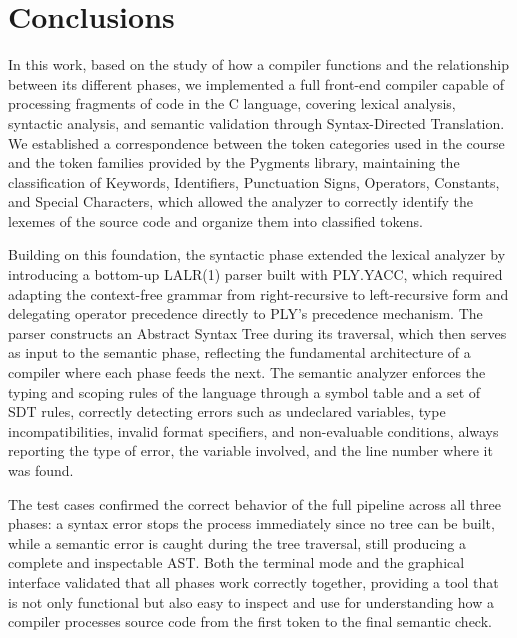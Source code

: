 \documentclass[letterpaper,12pt,oneside]{article}
\begin{document}
\section{Conclusions}

In this work, based on the study of how a compiler functions and the relationship 
between its different phases, we implemented a full front-end compiler capable of 
processing fragments of code in the C language, covering lexical analysis, syntactic 
analysis, and semantic validation through Syntax-Directed Translation. We established 
a correspondence between the token categories used in the course and the token families 
provided by the Pygments library, maintaining the classification of Keywords, 
Identifiers, Punctuation Signs, Operators, Constants, and Special Characters, which 
allowed the analyzer to correctly identify the lexemes of the source code and organize 
them into classified tokens.

Building on this foundation, the syntactic phase extended the lexical analyzer by 
introducing a bottom-up LALR(1) parser built with PLY.YACC, which required adapting 
the context-free grammar from right-recursive to left-recursive form and delegating 
operator precedence directly to PLY's precedence mechanism. The parser constructs an 
Abstract Syntax Tree during its traversal, which then serves as input to the semantic 
phase, reflecting the fundamental architecture of a compiler where each phase feeds 
the next. The semantic analyzer enforces the typing and scoping rules of the language 
through a symbol table and a set of SDT rules, correctly detecting errors such as 
undeclared variables, type incompatibilities, invalid format specifiers, and 
non-evaluable conditions, always reporting the type of error, the variable involved, 
and the line number where it was found.

The test cases confirmed the correct behavior of the full pipeline across all three 
phases: a syntax error stops the process immediately since no tree can be built, while 
a semantic error is caught during the tree traversal, still producing a complete and 
inspectable AST. Both the terminal mode and the graphical interface validated that all 
phases work correctly together, providing a tool that is not only functional but also 
easy to inspect and use for understanding how a compiler processes source code from 
the first token to the final semantic check.


\nocite{*}
\printbibliography[heading=bibintoc, title={References}]
    
\end{document}
